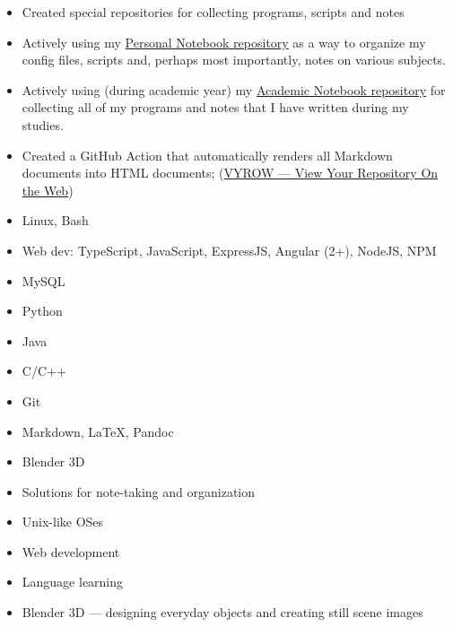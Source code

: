 \documentclass[10pt,a4paper,ragged2e,withhyper]{altacv}
\begin{document}
\begin{paracol}{2}
\divider

\begin{itemize}
\item Created special repositories for collecting programs, scripts and notes
\item Actively using my \href{https://personal.jerry-sky.me}{Personal Notebook repository} as a way to organize my config files, scripts and, perhaps most importantly, notes on various subjects.
\item Actively using (during academic year) my \href{https://academic.jerry-sky.me}{Academic Notebook repository} for collecting all of my programs and notes that I have written during my studies.
\item Created a GitHub Action that automatically renders all Markdown documents into HTML documents; (\href{https://github.com/marketplace/actions/vyrow}{VYROW — View Your Repository On the Web})
\end{itemize}

\divider

\switchcolumn



\begin{itemize}
\item Linux, Bash
\item Web dev: TypeScript, JavaScript, ExpressJS, Angular (2+), NodeJS, NPM
\item MySQL
\item Python
\item Java
\item C/C++
\item Git
\item Markdown, LaTeX, Pandoc
\item Blender 3D
\end{itemize}


\begin{itemize}
  \item Solutions for note-taking and organization
  \item Unix-like OSes
  \item Web development
  \item Language learning
  \item Blender 3D — designing everyday objects and creating still scene images
\end{itemize}


\end{paracol}
\end{document}
